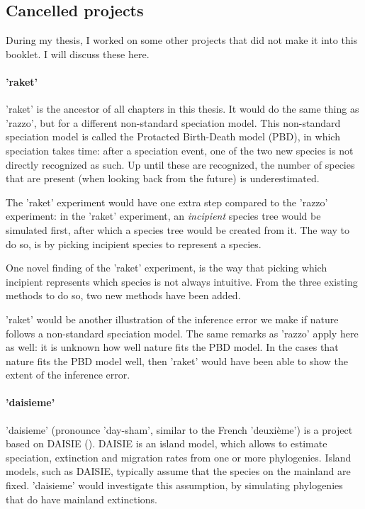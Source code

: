 \subsection{Cancelled projects}

During my thesis, I worked on some other projects that did not make
it into this booklet. I will discuss these here.

\paragraph{'raket'} 

'raket' is the ancestor of all chapters in this thesis.
It would do the same thing as 'razzo', but for a different non-standard 
speciation model. This non-standard speciation model is
called the Protacted Birth-Death model (PBD), in which speciation
takes time: after a speciation event, one of the two new species is not
directly recognized as such. Up until these are recognized, the number
of species that are present (when looking back from the future) 
is underestimated.

The 'raket' experiment would have one extra step compared to the 'razzo'
experiment: in the 'raket' experiment, an \emph{incipient} species tree
would be simulated first, after which a species tree would be created
from it. The way to do so, is by picking incipient species to represent
a species.

One novel finding of the 'raket' experiment, is the way that picking
which incipient represents which species is not always intuitive.
From the three existing methods to do so, two new methods have been added. 

'raket' would be another illustration of the inference error we make
if nature follows a non-standard speciation model. The same remarks as
'razzo' apply here as well: it is unknown how well nature fits the PBD model.
In the cases that nature fits the PBD model well, then 'raket' would have
been able to show the extent of the inference error.

\paragraph{'daisieme'} 

'daisieme' (pronounce 'day-sham', similar to the French 'deuxième') is
a project based on DAISIE (\cite{daisie}). DAISIE is an island model,
which allows to estimate speciation, extinction and migration rates 
from one or more phylogenies. Island models, such as DAISIE, typically
assume that the species on the mainland are fixed. 'daisieme' would
investigate this assumption, by simulating phylogenies that do have
mainland extinctions.

